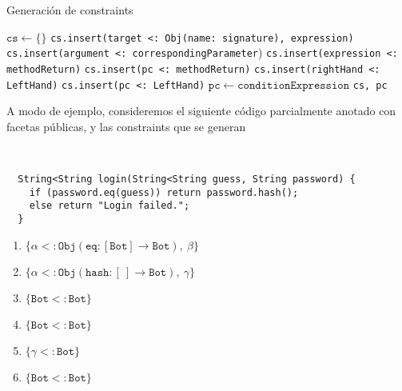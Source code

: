 \begin{algorithm}\captionsetup{labelsep=newline}
  \centering
  \caption{Generación de constraints}
  \label{pseudogen}
    \begin{algorithmic}[1]
          \State $\mathtt{cs\gets \{\}}$
              \State \texttt{cs.insert(target <: Obj(name: signature), expression)}
                \State \texttt{cs.insert(argument <: correspondingParameter})
              \EndFor
            \EndCase
              \State \texttt{cs.insert(expression <: methodReturn)}
              \State \texttt{cs.insert(pc <: methodReturn)}
            \EndCase
              \State \texttt{cs.insert(rightHand <: LeftHand)}
              \State \texttt{cs.insert(pc <: LeftHand)}
            \EndCase
              \State $\mathtt{pc\gets conditionExpression}$
            \EndCase
          \EndSwitch
          \State \Return \texttt{cs, pc}
      \EndFunction
    \end{algorithmic}
\end{algorithm}
A modo de ejemplo, consideremos el siguiente código parcialmente anotado con facetas públicas, y las constraints que se generan



\begin{ej}\ \\
  \label{ej3-1}
  \normalfont
  \begin{lstlisting}
  String<String login(String<String guess, String password) {
    if (password.eq(guess)) return password.hash();
    else return "Login failed.";
  }
  \end{lstlisting}
  \begin{enumerate}
    \item $\mathtt{\{\alpha <: Obj(eq : [Bot] \rightarrow Bot),\ \beta\}}$
    \item $\mathtt{\{\alpha <: Obj(hash : [\ ] \rightarrow Bot),\ \gamma\}}$
    \item $\mathtt{\{Bot <: Bot\}}$
    \item $\mathtt{\{Bot <: Bot\}}$
    \item $\mathtt{\{\gamma <: Bot\}}$
    \item $\mathtt{\{Bot <: Bot\}}$
  \end{enumerate}
\end{ej}



